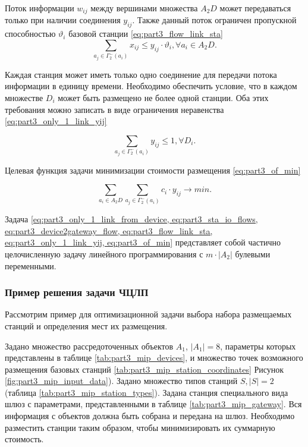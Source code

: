 Поток информации $w_{ij}$ между вершинами множества $A_2D$ может передаваться только при наличии соединения $y_{ij}$. Также данный поток ограничен пропускной способностью $\vartheta_i$ базовой станции  \cref{eq:part3_flow_link_sta}
\begin{equation}\label{eq:part3_flow_link_sta}
    \sum_{a_j \in \Gamma_2^-(a_i)} x_{ij} \leqslant y_{ij} \cdot \vartheta_i, \forall a_i \in A_2D.
\end{equation}

Каждая станция может иметь только одно соединение для передачи потока информации в единицу времени. Необходимо обеспечить условие, что в каждом множестве $D_i$ может быть размещено не более одной станции. Оба этих требования можно записать в виде ограничения неравенства \cref{eq:part3_only_1_link_yij}

\begin{equation}\label{eq:part3_only_1_link_yij}
    \sum_{a_j \in \Gamma_2^-(a_i)} y_{ij} \leqslant 1, \forall D_i.
\end{equation}

Целевая функция задачи минимизации стоимости размещения \cref{eq:part3_of_min}

\begin{equation}\label{eq:part3_of_min}
    \sum_{a_i \in A_2D} \sum_{a_j \in \Gamma_2^-(a_i)}c_i \cdot y_{ij} \to min.
\end{equation}

Задача \cref{eq:part3_only_1_link_from_device, eq:part3_sta_io_flows, eq:part3_device2gateway_flow, eq:part3_flow_link_sta, eq:part3_only_1_link_yij, eq:part3_of_min} представляет собой частично целочисленную задачу линейного программирования с $m \cdot |A_2|$ булевыми переменными. 

\subsubsection{Пример решения задачи ЧЦЛП}

Рассмотрим пример для оптимизационной задачи выбора набора размещаемых станций и определения мест их размещения.

Задано множество рассредоточенных объектов $A_1$, $|A_1| = 8$, параметры которых представлены в таблице \cref{tab:part3_mip_devices}, и множество точек возможного размещения базовых станций \cref{tab:part3_mip_station_coordinates} Рисунок \cref{fig:part3_mip_input_data}). Задано множество типов станций $S, |S| = 2$ (таблица \cref{tab:part3_mip_station_types}). Задана станция специального вида шлюз с параметрами, представленными в таблице  \cref{tab:part3_mip_gateway}. Вся информация с объектов должна быть собрана и  передана на шлюз. Необходимо разместить станции таким образом, чтобы минимизировать их суммарную стоимость. 


